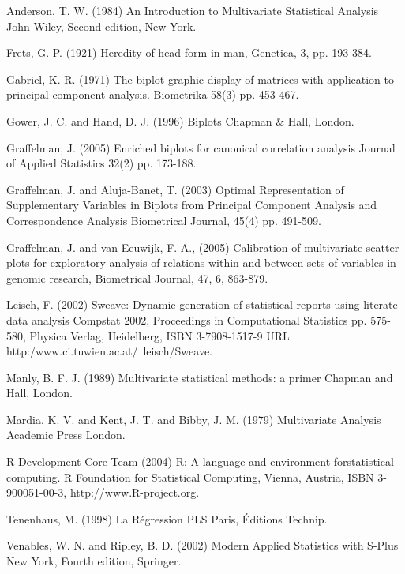 \documentclass[a4paper]{article}
\begin{document}

\begin{thebibliography}{10}

Anderson, T. W.
(1984)
{A}n {I}ntroduction to {M}ultivariate {S}tatistical {A}nalysis
John Wiley,
Second edition,
New York.
  
Frets, G. P.
(1921)
Heredity of head form in man,
Genetica,
3, 
pp. 193-384.

Gabriel, K. R. 
(1971)
The biplot graphic display of matrices with application to principal component analysis.
Biometrika 
58(3) 
pp. 453-467.

Gower, J. C. and Hand, D. J.
(1996)
Biplots
Chapman \& Hall,
London.

Graffelman, J.
(2005)
Enriched biplots for canonical correlation analysis
Journal of Applied Statistics
32(2)
pp. 173-188.

Graffelman, J. and Aluja-Banet, T.
(2003)
Optimal Representation of Supplementary Variables in Biplots from Principal Component Analysis and Correspondence Analysis
Biometrical Journal,
45(4)
pp. 491-509.

Graffelman, J. and van Eeuwijk, F. A.,
(2005)
Calibration of multivariate scatter plots for exploratory analysis of relations within and between sets of variables 
in genomic research,
Biometrical Journal,
47,
6,
863-879.

Leisch, F.
(2002)
Sweave: Dynamic generation of statistical reports using literate data analysis
Compstat 2002, Proceedings in Computational Statistics
pp. 575-580,
Physica Verlag, Heidelberg,
ISBN 3-7908-1517-9
URL http:/www.ci.tuwien.ac.at/~leisch/Sweave.

Manly, B. F. J.
(1989)
Multivariate statistical methods: a primer
Chapman and Hall, London.

Mardia, K. V. and Kent, J. T. and Bibby, J. M.
(1979)
Multivariate Analysis
Academic Press London.

R Development Core Team 
(2004) 
R: A language and environment forstatistical computing.
R Foundation for Statistical Computing,
Vienna, Austria,
ISBN 3-900051-00-3,
http://www.R-project.org.

Tenenhaus, M.
(1998)
La R\'{e}gression PLS
Paris, \'Editions Technip.

Venables, W. N. and Ripley, B. D.
(2002)
{M}odern {A}pplied {S}tatistics with {S}-{P}lus
New York,
Fourth edition,
Springer.


\end{thebibliography}
\end{document}
